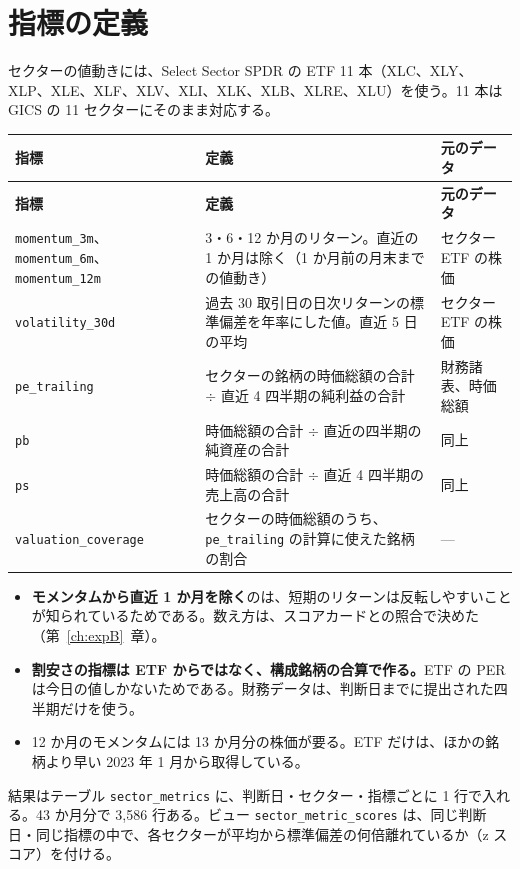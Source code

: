 \documentclass[xelatex,ja=standard,jafont=hiragino-pron,a4paper,10pt]{bxjsreport}
\newcommand{\code}[1]{\texttt{#1}}
\newcommand{\chapref}[1]{第~\ref{#1}~章}
\begin{document}
\section{指標の定義}

セクターの値動きには、Select Sector SPDR の ETF 11 本（XLC、XLY、XLP、XLE、XLF、XLV、XLI、XLK、XLB、XLRE、XLU）を使う。11 本は GICS の 11 セクターにそのまま対応する。

\begin{longtable}{p{3.60cm}p{7.60cm}p{3.20cm}}
\toprule
\textbf{指標} & \textbf{定義} & \textbf{元のデータ} \\
\midrule
\endfirsthead
\toprule
\textbf{指標} & \textbf{定義} & \textbf{元のデータ} \\
\midrule
\endhead
\bottomrule
\endfoot
\code{momentum\_3m}、\code{momentum\_6m}、\code{momentum\_12m} & 3・6・12 か月のリターン。直近の 1 か月は除く（1 か月前の月末までの値動き） & セクター ETF の株価 \\
\code{volatility\_30d} & 過去 30 取引日の日次リターンの標準偏差を年率にした値。直近 5 日の平均 & セクター ETF の株価 \\
\code{pe\_trailing} & セクターの銘柄の時価総額の合計 $\div$ 直近 4 四半期の純利益の合計 & 財務諸表、時価総額 \\
\code{pb} & 時価総額の合計 $\div$ 直近の四半期の純資産の合計 & 同上 \\
\code{ps} & 時価総額の合計 $\div$ 直近 4 四半期の売上高の合計 & 同上 \\
\code{valuation\_coverage} & セクターの時価総額のうち、\code{pe\_trailing} の計算に使えた銘柄の割合 & --- \\
\end{longtable}

\begin{itemize}
\item \textbf{モメンタムから直近 1 か月を除く}のは、短期のリターンは反転しやすいことが知られているためである。数え方は、スコアカードとの照合で決めた（\chapref{ch:expB}）。
\item \textbf{割安さの指標は ETF からではなく、構成銘柄の合算で作る。}ETF の PER は今日の値しかないためである。財務データは、判断日までに提出された四半期だけを使う。
\item 12 か月のモメンタムには 13 か月分の株価が要る。ETF だけは、ほかの銘柄より早い 2023 年 1 月から取得している。
\end{itemize}

結果はテーブル \code{sector\_metrics} に、判断日・セクター・指標ごとに 1 行で入れる。43 か月分で 3,586 行ある。ビュー \code{sector\_metric\_scores} は、同じ判断日・同じ指標の中で、各セクターが平均から標準偏差の何倍離れているか（z スコア）を付ける。
\end{document}
